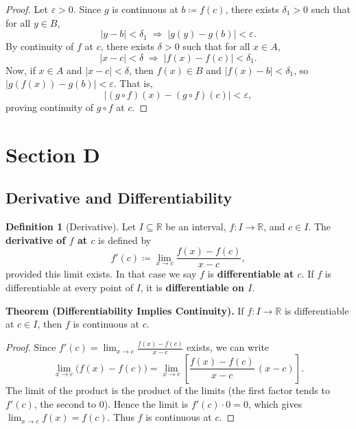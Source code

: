 \documentclass[12pt,a4paper]{article}
\theoremstyle{definition}
\newtheorem*{definition}{Definition}
\newcommand{\R}{\mathbb{R}}
\newcommand{\eps}{\varepsilon}
\newcommand{\abs}[1]{\left\lvert#1\right\rvert}
\begin{document}
\begin{proof}
Let \(\eps>0\). Since \(g\) is continuous at \(b\coloneqq f(c)\), there exists \(\delta_1>0\) such that for all \(y\in B\),
\[
\abs{y-b}<\delta_1 \;\Longrightarrow\; \abs{g(y)-g(b)}<\eps.
\]
By continuity of \(f\) at \(c\), there exists \(\delta>0\) such that for all \(x\in A\),
\[
\abs{x-c}<\delta \;\Longrightarrow\; \abs{f(x)-f(c)}<\delta_1.
\]
Now, if \(x\in A\) and \(\abs{x-c}<\delta\), then \(f(x)\in B\) and \(\abs{f(x)-b}<\delta_1\), so \(\abs{g(f(x))-g(b)}<\eps\). That is,
\[
\abs{(g\circ f)(x)-(g\circ f)(c)}<\eps,
\]
proving continuity of \(g\circ f\) at \(c\).
\end{proof}

\newpage
\section{Section D}

\subsection{Derivative and Differentiability}

\begin{definition}[Derivative]
Let \(I\subseteq\R\) be an interval, \(f:I\to\R\), and \(c\in I\). The \textbf{derivative of \(f\) at \(c\)} is defined by
\[
f'(c) \coloneqq \lim_{x\to c} \frac{f(x)-f(c)}{x-c},
\]
provided this limit exists. In that case we say \(f\) is \textbf{differentiable at \(c\)}. If \(f\) is differentiable at every point of \(I\), it is \textbf{differentiable on \(I\)}.
\end{definition}

\textbf{Theorem (Differentiability Implies Continuity).} If \(f:I\to\R\) is differentiable at \(c\in I\), then \(f\) is continuous at \(c\).

\begin{proof}
Since \(f'(c) = \lim_{x\to c}\frac{f(x)-f(c)}{x-c}\) exists, we can write
\[
\lim_{x\to c}\bigl(f(x)-f(c)\bigr) = \lim_{x\to c}\left[\frac{f(x)-f(c)}{x-c}\,(x-c)\right].
\]
The limit of the product is the product of the limits (the first factor tends to \(f'(c)\), the second to \(0\)). Hence the limit is \(f'(c)\cdot0 = 0\), which gives \(\lim_{x\to c}f(x)=f(c)\). Thus \(f\) is continuous at \(c\).
\end{proof}
\end{document}
